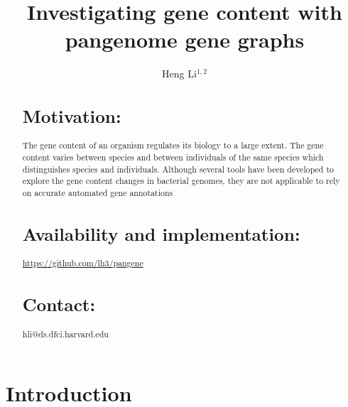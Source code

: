 \documentclass{bioinfo}
\begin{document}

\title[Pangene graphs]{Investigating gene content with pangenome gene graphs}
\author[Li]{Heng Li$^{1,2}$}
\address{$^1$Dana-Farber Cancer Institute, 450 Brookline Ave, Boston, MA 02215, USA,
$^2$Harvard Medical School, 10 Shattuck St, Boston, MA 02215, USA}

\maketitle

\begin{abstract}

\section{Motivation:}
The gene content of an organism regulates its biology to a large extent. The
gene content varies between species and between individuals of the same species
which distinguishes species and individuals. Although several tools have been
developed to explore the gene content changes in bacterial genomes, they are not applicable to rely
on accurate automated gene annotations

\section{Availability and implementation:}
\href{https://github.com/lh3/pangene}{https://github.com/lh3/pangene}

\section{Contact:} hli@ds.dfci.harvard.edu
\end{abstract}

\section*{Introduction}
\end{document}
